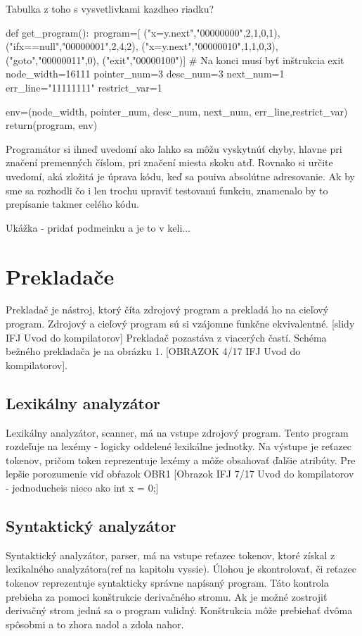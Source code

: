 Tabulka z toho s vysvetlivkami kazdheo riadku?

def get_program()$\colon$
   program=[
        ("x=y.next","00000000",2,1,0,1),
        ("ifx==null","00000001",2,4,2),
        ("x=y.next","00000010",1,1,0,3),
        ("goto","00000011",0),
        ("exit","00000100")]   # Na konci musí byť inštrukcia exit
    node_width=16111 
    pointer_num=3
    desc_num=3
    next_num=1
    err_line="11111111"
    restrict_var=1

    env=(node_width, pointer_num, desc_num, next_num, err_line,restrict_var)
    return(program, env)

Programátor si ihneď uvedomí ako ľahko sa môžu vyskytnúť chyby, hlavne pri značení
premenných číslom, pri značení miesta skoku atď. Rovnako si určite uvedomí, aká zložitá
je úprava kódu, keď sa pouiva absolútne adresovanie.
Ak by sme sa rozhodli čo i len trochu upraviť testovanú funkciu, znamenalo by to
prepísanie takmer celého kódu.

Ukážka - pridať podmeinku a je to v keli...


\chapter{Prekladače}
Prekladač je nástroj, ktorý číta zdrojový program a prekladá ho na cieľový program.
Zdrojový a cieľový program sú si vzájomne funkčne ekvivalentné. [slidy IFJ Uvod do kompilatorov]
Prekladač pozastáva z viacerých častí. Schéma bežného prekladača je na obrázku 1.
[OBRAZOK 4/17 IFJ Uvod do kompilatorov].

\section{Lexikálny analyzátor}
Lexikálny analyzátor, scanner, má na vstupe zdrojový program. Tento program
rozdeľuje na lexémy - logicky oddelené lexikálne jednotky. Na výstupe je reťazec
tokenov, pričom token reprezentuje lexémy a môže obsahovať ďalšie atribúty.
Pre lepšie porozumenie viď obŕazok OBR1
[Obrazok IFJ 7/17 Uvod do kompilatorov - jednoducheis nieco ako int x = 0;]

\section{Syntaktický analyzátor}
Syntaktický analyzátor, parser, má na vstupe reťazec tokenov, ktoré získal
z lexikalného analyzátora(ref na kapitolu vyssie). Úlohou je skontrolovať, či
reťazec tokenov reprezentuje syntakticky správne napísaný program. Táto kontrola
prebieha za pomoci konštrukcie derivačného stromu. Ak je možné zostrojiť derivačný strom
jedná sa o program validný. Konštrukcia môže prebiehať dvôma spôsobmi a to zhora
nadol a zdola nahor.

